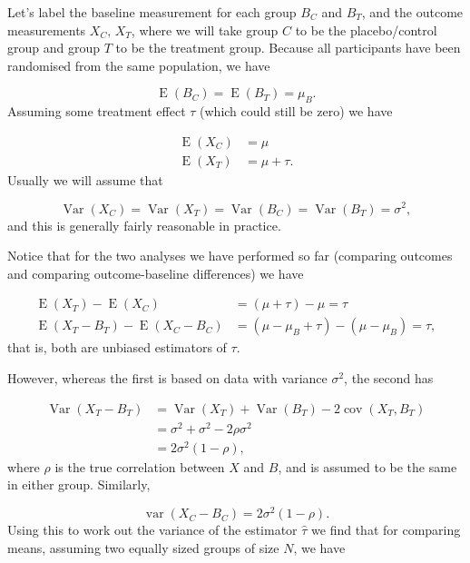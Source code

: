 \documentclass[
  openany]{book}
\theoremstyle{definition}
\theoremstyle{definition}
\theoremstyle{definition}
\theoremstyle{definition}
\theoremstyle{remark}
\begin{document}
Let's label the baseline measurement for each group \(B_C\) and \(B_T\), and the outcome measurements \(X_C,\,X_T\), where we will take group \(C\) to be the placebo/control group and group \(T\) to be the treatment group. Because all participants have been randomised from the same population, we have

\[\operatorname{E}\left(B_C\right) = \operatorname{E}\left(B_T\right) = \mu_B.\]
Assuming some treatment effect \(\tau\) (which could still be zero) we have

\[
\begin{aligned}
\operatorname{E}\left(X_C\right) & = \mu\\
\operatorname{E}\left(X_T\right) & = \mu + \tau.
\end{aligned}
\]
Usually we will assume that

\[\operatorname{Var}\left(X_C\right) = \operatorname{Var}\left(X_T\right) = \operatorname{Var}\left(B_C\right) = \operatorname{Var}\left(B_T\right) = \sigma^2,\]
and this is generally fairly reasonable in practice.

Notice that for the two analyses we have performed so far (comparing outcomes and comparing outcome-baseline differences) we have

\[
\begin{aligned}
\operatorname{E}\left(X_T\right) - \operatorname{E}\left(X_C\right) & = \left(\mu + \tau\right) - \mu = \tau\\
\operatorname{E}\left(X_T - B_T\right) - \operatorname{E}\left(X_C - B_C\right) & = \left(\mu - \mu_B + \tau\right) - \left(\mu - \mu_B\right) = \tau,
\end{aligned}
\]
that is, both are unbiased estimators of \(\tau\).

However, whereas the first is based on data with variance \(\sigma^2\), the second has

\[
\begin{aligned}
\operatorname{Var}\left(X_T-B_T\right) & = \operatorname{Var}\left(X_T\right) + \operatorname{Var}\left(B_T\right) - 2\operatorname{cov}\left(X_T,B_T\right)\\
& = \sigma^2 + \sigma^2 - 2\rho\sigma^2 \\
& = 2\sigma^2\left(1-\rho\right),
\end{aligned}
\]
where \(\rho\) is the true correlation between \(X\) and \(B\), and is assumed to be the same in either group. Similarly,

\[\operatorname{var}\left(X_C-B_C\right) = 2\sigma^2\left(1-\rho\right).\]
Using this to work out the variance of the estimator \(\hat{\tau}\) we find that for comparing means, assuming two equally sized groups of size \(N\), we have
\end{document}
